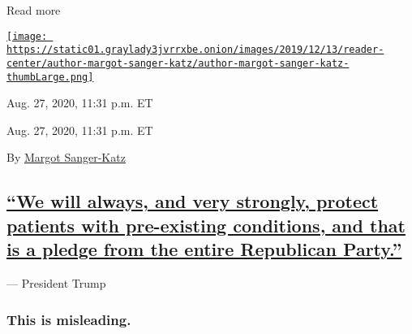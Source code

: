 Read more

\href{https://www.nytimes3xbfgragh.onion/by/margot-sanger-katz}{\texttt{[image: https://static01.graylady3jvrrxbe.onion/images/2019/12/13/reader-center/author-margot-sanger-katz/author-margot-sanger-katz-thumbLarge.png]}}

Aug. 27, 2020, 11:31 p.m. ET

Aug. 27, 2020, 11:31 p.m. ET

By
\href{https://www.nytimes3xbfgragh.onion/by/margot-sanger-katz}{Margot
Sanger-Katz}

\hypertarget{we-will-always-and-very-strongly-protect-patients-with-pre-existing-conditions-and-that-is-a-pledge-from-the-entire-republican-party}{%
\subsection{\texorpdfstring{\protect\hyperlink{we-will-always-and-very-strongly-protect-patients-with-pre-existing-conditions-and-that-is-a-pledge-from-the-entire-republican-p}{``We
will always, and very strongly, protect patients with pre-existing
conditions, and that is a pledge from the entire Republican
Party.''}}{``We will always, and very strongly, protect patients with pre-existing conditions, and that is a pledge from the entire Republican Party.''}}\label{we-will-always-and-very-strongly-protect-patients-with-pre-existing-conditions-and-that-is-a-pledge-from-the-entire-republican-party}}

--- President Trump

\hypertarget{this-is-misleading}{%
\subsubsection{This is misleading.}\label{this-is-misleading}}

